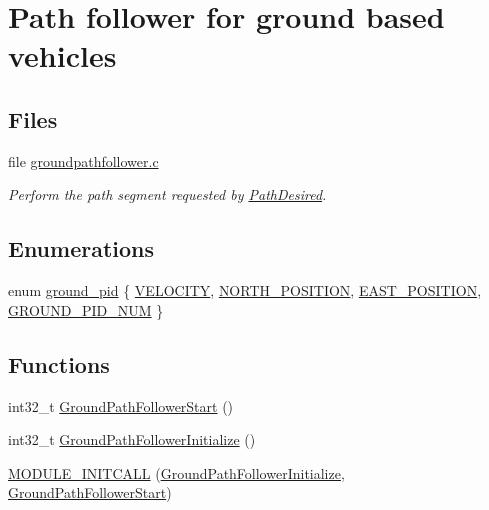 \hypertarget{group___ground_path_follower}{\section{\-Path follower for ground based vehicles}
\label{group___ground_path_follower}
}
\subsection*{\-Files}
\begin{DoxyCompactItemize}
\item 
file \hyperlink{groundpathfollower_8c}{groundpathfollower.\-c}
\begin{DoxyCompactList}\small\item\em \-Perform the path segment requested by \hyperlink{group___path_desired}{\-Path\-Desired}. \end{DoxyCompactList}\end{DoxyCompactItemize}
\subsection*{\-Enumerations}
\begin{DoxyCompactItemize}
\item 
enum \hyperlink{group___ground_path_follower_ga1223527343fc1b6614c7abf83ed7d170}{ground\-\_\-pid} \{ \hyperlink{group___ground_path_follower_gga1223527343fc1b6614c7abf83ed7d170a06e15744a8bd69fceeeb39ab3614b3f6}{\-V\-E\-L\-O\-C\-I\-T\-Y}, 
\hyperlink{group___ground_path_follower_gga1223527343fc1b6614c7abf83ed7d170a3f46558976ca7c653cc8c08475bcab2a}{\-N\-O\-R\-T\-H\-\_\-\-P\-O\-S\-I\-T\-I\-O\-N}, 
\hyperlink{group___ground_path_follower_gga1223527343fc1b6614c7abf83ed7d170a16d8665516d2ff93c39520ff3a7aaa10}{\-E\-A\-S\-T\-\_\-\-P\-O\-S\-I\-T\-I\-O\-N}, 
\hyperlink{group___ground_path_follower_gga1223527343fc1b6614c7abf83ed7d170a69d05de5d51b2fc72b5f8122e58f0033}{\-G\-R\-O\-U\-N\-D\-\_\-\-P\-I\-D\-\_\-\-N\-U\-M}
 \}
\end{DoxyCompactItemize}
\subsection*{\-Functions}
\begin{DoxyCompactItemize}
\item 
int32\-\_\-t \hyperlink{group___ground_path_follower_ga844090ee19407a7f78fe00806c3d66a7}{\-Ground\-Path\-Follower\-Start} ()
\item 
int32\-\_\-t \hyperlink{group___ground_path_follower_ga025f961b3b70a3ee5098c756f7f3507d}{\-Ground\-Path\-Follower\-Initialize} ()
\item 
\hyperlink{group___ground_path_follower_ga899760a5bd6b260314dc492e50590aae}{\-M\-O\-D\-U\-L\-E\-\_\-\-I\-N\-I\-T\-C\-A\-L\-L} (\hyperlink{group___ground_path_follower_ga025f961b3b70a3ee5098c756f7f3507d}{\-Ground\-Path\-Follower\-Initialize}, \hyperlink{group___ground_path_follower_ga844090ee19407a7f78fe00806c3d66a7}{\-Ground\-Path\-Follower\-Start})
\end{DoxyCompactItemize}


